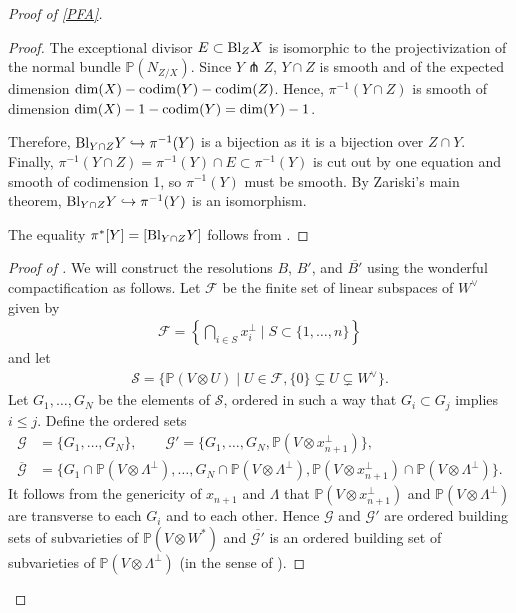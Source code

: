 \documentclass[12pt]{amsart}
\newcommand{\mb}{\mathbb}
\newcommand{\mc}{\mathcal}
\newcommand{\codim}{{\rm codim}}
\theoremstyle{plain}
\theoremstyle{definition}
\theoremstyle{remark}
\begin{document}
\begin{proof}[Proof of \cref{PFA}]
\begin{proof}
The exceptional divisor $E\subset {\rm Bl}_Z X$ is isomorphic to the projectivization of the normal bundle $\mb{P}(N_{Z/X})$. Since $Y\pitchfork Z$, $Y\cap Z$ is smooth and of the expected dimension $\dim(X)-\codim(Y)-\codim(Z)$. Hence, $\pi^{-1}(Y\cap Z)$ is smooth of dimension $\dim(X)-1-\codim(Y) = \dim(Y) - 1$.

Therefore, ${\rm Bl}_{Y\cap Z} Y\hookrightarrow \pi^{-1}(Y)$ is a bijection as it is a bijection over $Z\cap Y$. Finally, $\pi^{-1}(Y\cap Z)=\pi^{-1}(Y)\cap E\subset \pi^{-1}(Y)$ is cut out by one equation and smooth of codimension 1, so $\pi^{-1}(Y)$ must be smooth. By Zariski's main theorem,  ${\rm Bl}_{Y\cap Z} Y\hookrightarrow \pi^{-1}(Y)$ is an isomorphism. 

The equality $\pi^*[Y] = [{\rm Bl}_{Y\cap Z} Y]$ follows from \cite[Corollary~6.7.2]{Fulton}.
\end{proof}
\begin{proof}[Proof of ]
We will construct the resolutions $B$, $B'$, and $\overline{B'}$ using the wonderful compactification as follows. Let $\mc{F}$ be the finite set of linear subspaces of $W^{\vee}$ given by
\begin{align*}
\mc{F}=\left\{\bigcap_{i\in S}{x_i^{\perp}}\mid S\subset \{1,\ldots,n\}\right\}\end{align*}
and let
\begin{align*}
\mc{S}=\{\mb{P}(V \otimes U)\mid U\in \mc{F}, \{0\}\subsetneq U \subsetneq W^\vee\}. 
\end{align*}
Let $G_1, \ldots, G_N$ be the elements of $\mc{S}$, ordered in such a way that $G_i \subset G_j$ implies $i \leq j$. Define the ordered sets
\begin{align*}
\mc{G} &= \{G_1, \ldots, G_N\}, \qquad
\mc{G}' = \{G_1, \ldots, G_N, \mb{P}(V \otimes x_{n+1}^\perp)\}, \\
\overline{\mc{G}} &= \{G_1 \cap \mb{P}(V \otimes \Lambda^\perp), \ldots, G_N \cap \mb{P}(V \otimes \Lambda^\perp), \mb{P}(V \otimes x_{n+1}^\perp) \cap \mb{P}(V \otimes \Lambda^\perp)\}.
\end{align*}
It follows from the genericity of $x_{n+1}$ and $\Lambda$ that $\mb{P}(V \otimes x_{n+1}^\perp)$ and $\mb{P}(V \otimes \Lambda^\perp)$ are transverse to each $G_i$ and to each other. Hence $\mc{G}$ and $\mc{G}'$ are ordered building sets of subvarieties of $\mb{P}(V \otimes W^*)$ and $\overline{\mc{G}'}$ is an ordered building set of subvarieties of $\mb{P}(V \otimes \Lambda^\perp)$ (in the sense of ).


\end{proof}
\end{proof}
\end{document}
